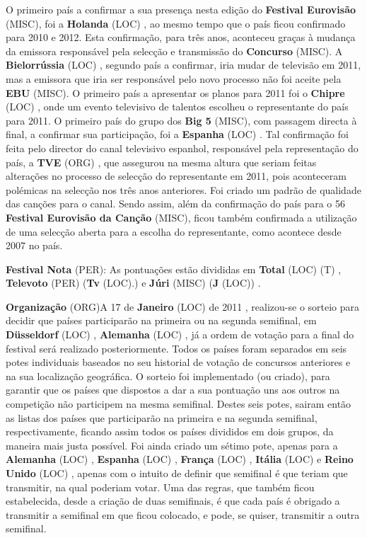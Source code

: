 \documentclass[12pt,a4paper]{article}
\begin{document}
O primeiro país a confirmar a sua presença nesta edição do \textbf{Festival Eurovisão} (MISC), foi a \textbf{Holanda} (LOC) , ao mesmo tempo que o país ficou confirmado para 2010 e 2012. Esta confirmação, para três anos, aconteceu graças à mudança da emissora responsável pela selecção e transmissão do \textbf{Concurso} (MISC). A \textbf{Bielorrússia} (LOC) , segundo país a confirmar, iria mudar de televisão em 2011, mas a emissora que iria ser responsável pelo novo processo não foi aceite pela \textbf{EBU} (MISC). O primeiro país a apresentar os planos para 2011 foi o \textbf{Chipre} (LOC) , onde um evento televisivo de talentos escolheu o representante do país para 2011. O primeiro país do grupo dos \textbf{Big 5} (MISC), com passagem directa à final, a confirmar sua participação, foi a \textbf{Espanha} (LOC) . Tal confirmação foi feita pelo director do canal televisivo espanhol, responsável pela representação do país, a \textbf{TVE} (ORG) , que assegurou na mesma altura que seriam feitas alterações no processo de selecção do representante em 2011, pois aconteceram polémicas na selecção nos três anos anteriores. Foi criado um padrão de qualidade das canções para o canal. Sendo assim, além da confirmação do país para o 56 \textbf{Festival Eurovisão da Canção} (MISC), ficou também confirmada a utilização de uma selecção aberta para a escolha do representante, como acontece desde 2007 no país.



\textbf{Festival Nota} (PER): As pontuações estão divididas em \textbf{Total} (LOC) (T) , \textbf{Televoto} (PER) (\textbf{Tv} (LOC).) e \textbf{Júri} (MISC) (\textbf{J} (LOC)) .



\textbf{Organização} (ORG)A 17 de \textbf{Janeiro} (LOC) de 2011 , realizou-se o sorteio para decidir que países participarão na primeira ou na segunda semifinal, em \textbf{Düsseldorf} (LOC) , \textbf{Alemanha} (LOC) , já a ordem de votação para a final do festival será realizado posteriormente. Todos os países foram separados em seis potes individuais baseados no seu historial de votação de concursos anteriores e na sua localização geográfica. O sorteio foi implementado (ou criado), para garantir que os países que dispostos a dar a sua pontuação uns aos outros na competição não participem na mesma semifinal. Destes seis potes, sairam então as listas dos países que participarão na primeira e na segunda semifinal, respectivamente, ficando assim todos os países divididos em dois grupos, da maneira mais justa possível. Foi ainda criado um sétimo pote, apenas para a \textbf{Alemanha} (LOC) , \textbf{Espanha} (LOC) , \textbf{França} (LOC) , \textbf{Itália} (LOC) e \textbf{Reino Unido} (LOC) , apenas com o intuito de definir que semifinal é que teriam que transmitir, na qual poderiam votar. Uma das regras, que também ficou estabelecida, desde a criação de duas semifinais, é que cada país é obrigado a transmitir a semifinal em que ficou colocado, e pode, se quiser, transmitir a outra semifinal.
\end{document}
